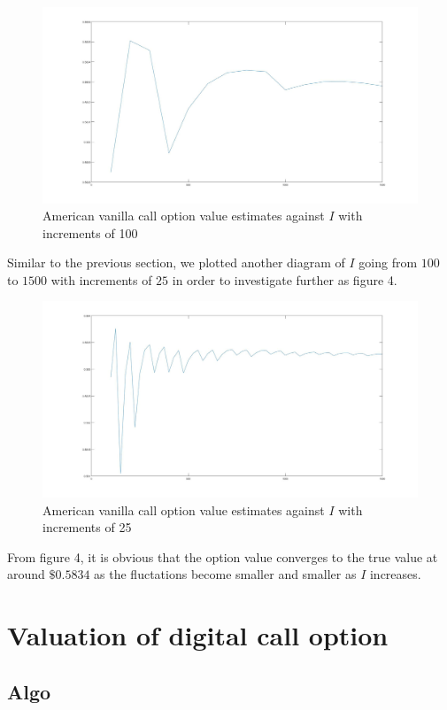 \begin{figure}[htbp!]
	\centering
	\includegraphics[scale=0.2]{smallPlot2.jpg}
	\caption{American vanilla call option value estimates against $I$ with increments of 100}
\end{figure}

Similar to the previous section, we plotted another diagram of $I$ going from $100$ to $1500$ with increments of $25$ in order to investigate further as figure 4.

\begin{figure}[htbp!]
	\centering
	\includegraphics[scale=0.2]{largePlot2.jpg}
	\caption{American vanilla call option value estimates against $I$ with increments of 25}
\end{figure}

From figure 4, it is obvious that the option value converges to the true value at around $\$0.5834$ as the fluctations become smaller and smaller as $I$ increases.

\section{Valuation of digital call option}

\subsection{Algo}




